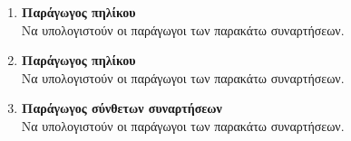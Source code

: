 \documentclass[twoside,nofonts,internet]{askhseis}
\begin{document}
\begin{enumerate}
\begin{multicols}{2}
\end{multicols}
\item \textbf{Παράγωγος πηλίκου}\\
Να υπολογιστούν οι παράγωγοι των παρακάτω συναρτήσεων.
\begin{multicols}{2}
\end{multicols}
\item \textbf{Παράγωγος πηλίκου}\\
Να υπολογιστούν οι παράγωγοι των παρακάτω συναρτήσεων.
\begin{multicols}{2}
\end{multicols}
\item \textbf{Παράγωγος σύνθετων συναρτήσεων}\\
Να υπολογιστούν οι παράγωγοι των παρακάτω συναρτήσεων.
\begin{multicols}{2}
\end{multicols}

\end{enumerate}
\end{document}
